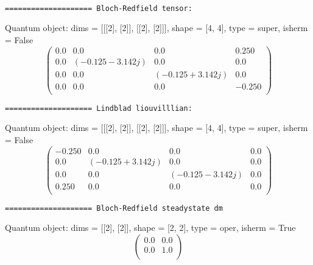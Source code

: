 \documentclass{article}
\begin{document}
    \begin{center}
    \end{center}
    { \hspace*{\fill} \\}
    
    \begin{Verbatim}[commandchars=\\\{\}]
==================== Bloch-Redfield tensor:
    \end{Verbatim}

    Quantum object: dims = [[[2], [2]], [[2], [2]]], shape = [4, 4], type = super, isherm = False\begin{equation*}\begin{pmatrix}0.0 & 0.0 & 0.0 & 0.250\\0.0 & (-0.125-3.142j) & 0.0 & 0.0\\0.0 & 0.0 & (-0.125+3.142j) & 0.0\\0.0 & 0.0 & 0.0 & -0.250\\\end{pmatrix}\end{equation*}

    
    \begin{Verbatim}[commandchars=\\\{\}]
==================== Lindblad liouvilllian:
    \end{Verbatim}

    Quantum object: dims = [[[2], [2]], [[2], [2]]], shape = [4, 4], type = super, isherm = False\begin{equation*}\begin{pmatrix}-0.250 & 0.0 & 0.0 & 0.0\\0.0 & (-0.125+3.142j) & 0.0 & 0.0\\0.0 & 0.0 & (-0.125-3.142j) & 0.0\\0.250 & 0.0 & 0.0 & 0.0\\\end{pmatrix}\end{equation*}

    
    \begin{Verbatim}[commandchars=\\\{\}]
==================== Bloch-Redfield steadystate dm
    \end{Verbatim}

    Quantum object: dims = [[2], [2]], shape = [2, 2], type = oper, isherm = True\begin{equation*}\begin{pmatrix}0.0 & 0.0\\0.0 & 1.0\\\end{pmatrix}\end{equation*}
\end{document}
